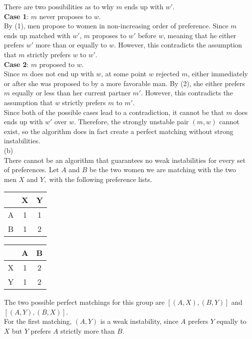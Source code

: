 \documentclass[oneside, 12pt]{article}
\begin{document}
\begin{enumerate}
\newline
There are two possibilities as to why $m$ ends up with $w'$.\\
\textbf{Case 1}: $m$ never proposes to $w$.\\
By (1), men propose to women in non-increasing order of preference. Since $m$ ends up matched with $w'$, $m$ proposes to $w'$ before $w$, meaning that he either prefers $w'$ more than or equally to $w$. However, this contradicts the assumption that $m$ strictly prefers $w$ to $w'$.\\
\textbf{Case 2}: $m$ proposed to $w$. \\
Since $m$ does not end up with $w$, at some point $w$ rejected $m$, either immediately or after she was proposed to by a more favorable man. By (2), she either prefers $m$ equally or less than her current partner $m'$. However, this contradicts the assumption that $w$ strictly prefers $m$ to $m'$.\\
\newline
Since both of the possible cases lead to a contradiction, it cannot be that $m$ does ends up with $w'$ over $w$. Therefore, the strongly unstable pair $(m, w)$ cannot exist, so the algorithm does in fact create a perfect matching without strong instabilities.\\
\newline
(b) \\
There cannot be an algorithm that guarantees no weak instabilities for every set of preferences. Let $A$ and $B$ be the two women we are matching with the two men $X$ and $Y,$ with the following preference lists.
\begin{table}[htb]
\centering
\begin{tabular}{c | c   c}
& X & Y \\
\hline
A & 1 & 1\\
B & 1 & 2
\end{tabular}
\qquad
\begin{tabular}{c | c   c}
& A & B \\
\hline
X & 1 & 2\\
Y & 1 & 2
\end{tabular}
\end{table}
\newline
The two possible perfect matchings for this group are $[(A, X), (B, Y)]$ and $[(A, Y), (B, X)]$.\\
\newline
For the first matching, $(A, Y)$ is a weak instability, since $A$ prefers $Y$ equally to $X$ but $Y$ prefers $A$ strictly more than $B$. \\

\end{enumerate}
\end{document}
